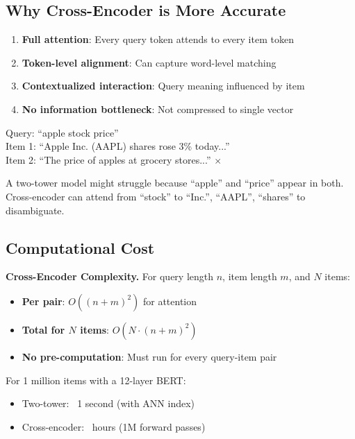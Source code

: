 \subsection{Why Cross-Encoder is More Accurate}

\begin{enumerate}
    \item \textbf{Full attention}: Every query token attends to every item token
    \item \textbf{Token-level alignment}: Can capture word-level matching
    \item \textbf{Contextualized interaction}: Query meaning influenced by item
    \item \textbf{No information bottleneck}: Not compressed to single vector
\end{enumerate}

\begin{example}
Query: ``apple stock price''\\
Item 1: ``Apple Inc. (AAPL) shares rose 3\% today...'' \checkmark\\
Item 2: ``The price of apples at grocery stores...'' $\times$

A two-tower model might struggle because ``apple'' and ``price'' appear in both. Cross-encoder can attend from ``stock'' to ``Inc.'', ``AAPL'', ``shares'' to disambiguate.
\end{example}

\subsection{Computational Cost}

\textbf{Cross-Encoder Complexity.} For query length $n$, item length $m$, and $N$ items:
\begin{itemize}
    \item \textbf{Per pair}: $O((n+m)^2)$ for attention
    \item \textbf{Total for $N$ items}: $O(N \cdot (n+m)^2)$
    \item \textbf{No pre-computation}: Must run for every query-item pair
\end{itemize}

For 1 million items with a 12-layer BERT:
\begin{itemize}
    \item Two-tower: ~1 second (with ANN index)
    \item Cross-encoder: ~hours (1M forward passes)
\end{itemize}

